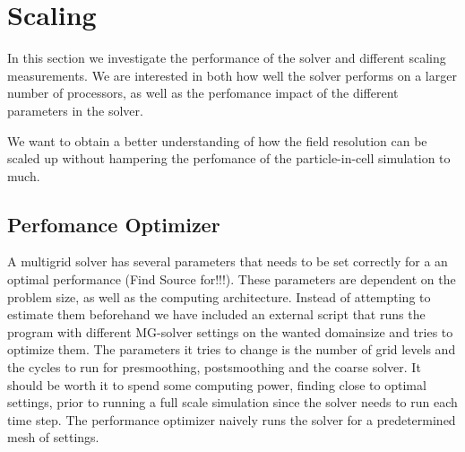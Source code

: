 \section{Scaling}
  In this section we investigate the performance of the solver and different scaling
  measurements. We are interested in both how well the solver performs on a larger
  number of processors, as well as the perfomance impact of the different
  parameters in the solver.

  We want to obtain a better understanding of how the field resolution can be scaled
  up without hampering the perfomance of the particle-in-cell simulation to much.

  \subsection{Perfomance Optimizer}
    A multigrid solver has several parameters that needs to be set correctly for
    a an optimal performance (Find Source for!!!). These parameters are dependent on the problem size,
    as well as the computing architecture. Instead of attempting to estimate them beforehand
    we have included an external script that runs the program with different MG-solver
    settings on the wanted domainsize and tries to optimize them.
    The parameters it tries to change is the number of grid levels and the cycles
    to run for presmoothing, postsmoothing and the coarse solver. It should be worth it
    to spend some computing power, finding close to optimal settings,  prior to
    running a full scale simulation since the solver needs to run each time step.
    The performance optimizer naively runs the solver for a predetermined mesh of
    settings.

